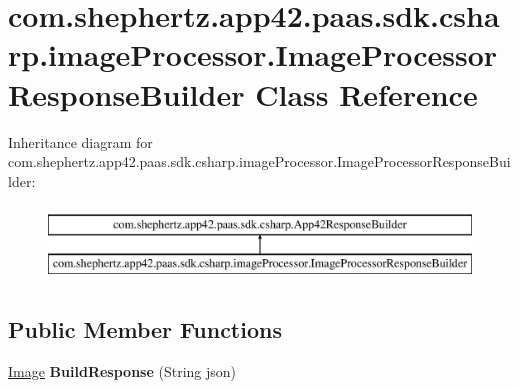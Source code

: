 \hypertarget{classcom_1_1shephertz_1_1app42_1_1paas_1_1sdk_1_1csharp_1_1image_processor_1_1_image_processor_response_builder}{\section{com.\+shephertz.\+app42.\+paas.\+sdk.\+csharp.\+image\+Processor.\+Image\+Processor\+Response\+Builder Class Reference}
\label{classcom_1_1shephertz_1_1app42_1_1paas_1_1sdk_1_1csharp_1_1image_processor_1_1_image_processor_response_builder}
}
Inheritance diagram for com.\+shephertz.\+app42.\+paas.\+sdk.\+csharp.\+image\+Processor.\+Image\+Processor\+Response\+Builder\+:\begin{figure}[H]
\begin{center}
\leavevmode
\includegraphics[height=2.000000cm]{classcom_1_1shephertz_1_1app42_1_1paas_1_1sdk_1_1csharp_1_1image_processor_1_1_image_processor_response_builder}
\end{center}
\end{figure}
\subsection*{Public Member Functions}
\begin{DoxyCompactItemize}
\item 
\hypertarget{classcom_1_1shephertz_1_1app42_1_1paas_1_1sdk_1_1csharp_1_1image_processor_1_1_image_processor_response_builder_a71eafdd64c6cc8fac8baf27136267c53}{\hyperlink{classcom_1_1shephertz_1_1app42_1_1paas_1_1sdk_1_1csharp_1_1image_processor_1_1_image}{Image} {\bfseries Build\+Response} (String json)}\label{classcom_1_1shephertz_1_1app42_1_1paas_1_1sdk_1_1csharp_1_1image_processor_1_1_image_processor_response_builder_a71eafdd64c6cc8fac8baf27136267c53}

\end{DoxyCompactItemize}

